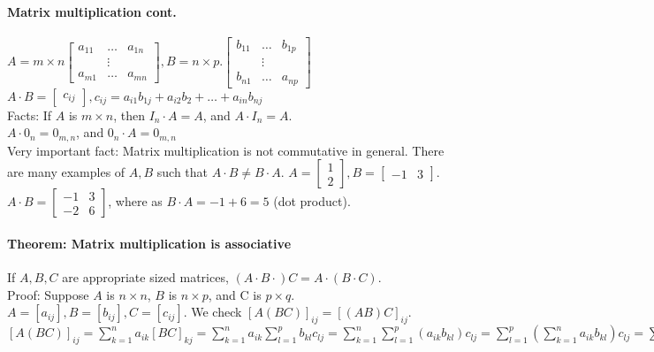 \documentclass[10pt,letter]{article}
\begin{document}
\paragraph{Matrix multiplication cont.}
$A=m\times n
\begin{bmatrix}
a_{11} & \ldots & a_{1n} \\
 & \vdots \\
a_{m1} & \ldots & a_{mn}
\end{bmatrix}, B=n\times p. 
\begin{bmatrix}
b_{11} & \ldots & b_{1p} \\
 & \vdots \\
b_{n1} & \ldots & a_{np}
\end{bmatrix}$ 
$A\cdot B = 
\begin{bmatrix}c_{ij}
\end{bmatrix}, c_{ij}=a_{i1}b_{1j}+a_{i2}b_{2}+\ldots+a_{in}b_{nj}$ \\ 
Facts: If $A$ is $m\times n$, then $I_n\cdot A = A$, and $A\cdot I_n=A$. \\
$A\cdot 0_n=0_{m,n}$, and $0_n\cdot A = 0_{m,n}$ \\ 
Very important fact: Matrix multiplication is not commutative in general. There are many examples of $A,B$ such that $A\cdot B\neq B\cdot A$. $A=\begin{bmatrix}
1\\2
\end{bmatrix}, B = \begin{bmatrix}-1&3\end{bmatrix}$. $A\cdot B = \begin{bmatrix}-1 & 3 \\ -2 & 6\end{bmatrix}$, where as $B\cdot A = -1 + 6 = 5$ (dot product). 

\paragraph{Theorem: Matrix multiplication is associative}
If $A,B,C$ are appropriate sized matrices, $(A\cdot B\cdot) C=A\cdot(B\cdot C)$.\\ 
Proof: Suppose $A$ is $n\times n$, $B$ is $n\times p$, and C is $p\times q$. $A=[a_{ij}],B=[b_{ij}],C=[c_{ij}]$. We check $[A(BC)]_{ij}=[(AB)C]_{ij}$. $[A(BC)]_{ij}=\sum_{k=1}^na_{ik}[BC]_{kj}=\sum_{k=1}^na_{ik}\sum_{l=1}^pb_{kl}c_{lj} = \sum_{k=1}^n\sum_{l=1}^p(a_{ik}b_{kl})c_{lj}=\sum_{l=1}^p(\sum_{k=1}^na_{ik}b_{kl})c_{lj}=\sum_{l=1}^p[AB]_{il}c_{lj}=[(AB)C]_{ij}$
\end{document}
